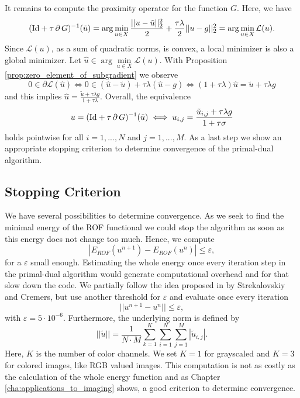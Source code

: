 \documentclass[abstracton]{scrreprt}
\begin{document}
            It remains to compute the proximity operator for the function $G$. Here, we have
                $$
                    (\textnormal{Id} + \tau\,\partial\,G)^{-1}(\tilde{u}) = \arg \min_{u \in X} \frac{||u - \tilde{u}||_{2}^{2}}{2} + \frac{\tau\lambda}{2} ||u - g||_{2}^{2} = \arg \min_{u \in X} \mathcal{L}(u).
                $$
            Since $\mathcal{L}(u)$, as a sum of quadratic norms, is convex, a local minimizer is also a global minimizer. Let $\hat{u} \in \arg \min\limits_{u \in X} \mathcal{L}(u)$. With Proposition \ref{prop:zero_element_of_subgradient} we observe
                $$
                    0 \in \partial \mathcal{L}(\hat{u}) \iff 0 \in (\hat{u} - \tilde{u}) + \tau\lambda (\hat{u} - g) \iff (1 + \tau\lambda)\hat{u} = \tilde{u} + \tau\lambda g
                $$
            and this implies $\hat{u} = \frac{\tilde{u} + \tau\lambda g}{1 + \tau\lambda}$. Overall, the equivalence
                \begin{equation}
                    u = (\textnormal{Id} + \tau\,\partial\,G)^{-1}(\tilde{u}) \iff u_{i,j} = \frac{\tilde{u}_{i,j} + \tau\lambda g}{1 + \tau\sigma}
                \label{eq:proximity_operator_g_rof}
                \end{equation}
            holds pointwise for all $i = 1, ..., N$ and $j = 1, ..., M$. As a last step we show an appropriate stopping criterion to determine convergence of the primal-dual algorithm.


        \subsection{Stopping Criterion} %
        \label{sub:stopping_criterion_rof}

            We have several possibilities to determine convergence. As we seek to find the minimal energy of the ROF functional we could stop the algorithm as soon as this energy does not change too much. Hence, we compute
                $$
                    |E_{ROF}(u^{n+1}) - E_{ROF}(u^{n})| \le \varepsilon,
                $$
             for a $\varepsilon$ small enough. Estimating the whole energy once every iteration step in the primal-dual algorithm would generate computational overhead and for that slow down the code. We partially follow the idea proposed in \cite{Strekalovskiy-Cremers-eccv14} by Strekalovskiy and Cremers, but use another threshold for $\varepsilon$ and evaluate once every iteration
                $$
                    ||u^{n+1} - u^{n}|| \le \varepsilon,
                $$
            with $\varepsilon = 5 \cdot 10^{-6}$. Furthermore, the underlying norm is defined by
                $$
                    ||\tilde{u}|| = \frac{1}{N \cdot M} \sum_{k = 1}^{K} \sum_{i = 1}^{N} \sum_{j = 1}^{M} |\tilde{u}_{i,j}|.
                $$
            Here, $K$ is the number of color channels. We set $K = 1$ for grayscaled and $K = 3$ for colored images, like RGB valued images. This computation is not as costly as the calculation of the whole energy function and as Chapter \ref{cha:applications_to_imaging} shows, a good criterion to determine convergence.
\end{document}
